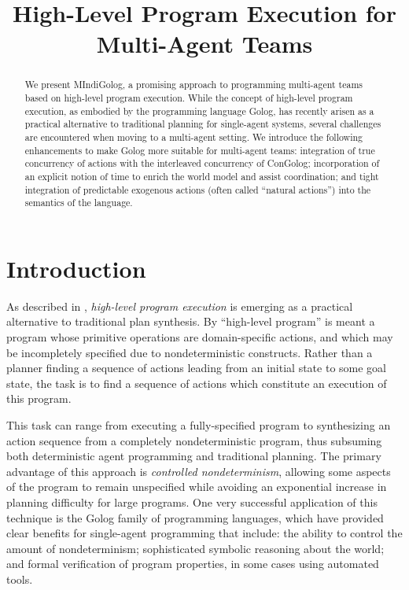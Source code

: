 \documentclass[letterpaper]{article}
\title{High-Level Program Execution for Multi-Agent Teams}
\begin{document}
\maketitle

\begin{abstract}
We present MIndiGolog, a promising approach to programming multi-agent teams
based on high-level program execution. While the concept of high-level program
execution, as embodied by the programming language Golog, has recently arisen
as a practical
alternative to traditional planning for single-agent systems, several
challenges are encountered when moving to a multi-agent setting.  We introduce
the following enhancements to make Golog more suitable for multi-agent teams:
integration of true concurrency of actions with the interleaved concurrency
of ConGolog; incorporation of an explicit notion of time to enrich the world
model and assist coordination; and tight integration of predictable
exogenous actions (often called ``natural actions'') into the semantics of
the language.
\end{abstract}

\section{Introduction}

As described in \cite{giacomo99indigolog}, \emph{high-level program execution}
is emerging as a practical alternative to traditional plan
synthesis. By ``high-level program'' is meant a program whose
primitive operations are domain-specific actions, and which may be
incompletely specified due to nondeterministic constructs. Rather
than a planner finding a sequence of actions leading from an initial
state to some goal state, the task is to
find a sequence of actions which constitute an execution of this program.

This task can range from executing a fully-specified program to synthesizing
an action sequence from a completely nondeterministic program, thus
subsuming both deterministic agent programming and traditional planning.
The primary advantage of this approach is \emph{controlled nondeterminism},
allowing some aspects of the program to remain unspecified while avoiding
an exponential increase in planning difficulty for large programs.
One very successful application of this technique is the Golog \cite{levesque97golog}
family of programming languages, which have provided clear benefits
for single-agent programming that include: the ability to control
the amount of nondeterminism; sophisticated symbolic reasoning about
the world; and formal verification of program properties, in some
cases using automated tools.
\end{document}
